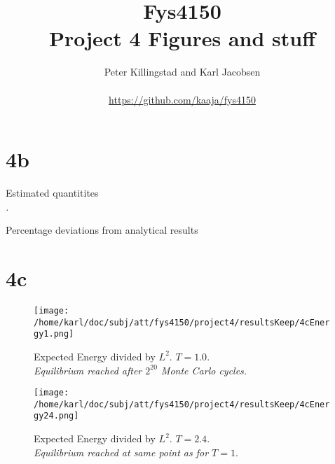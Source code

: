\documentclass{article}
\title{Fys4150\\Project 4 Figures and stuff\\ }
\author{Peter Killingstad and Karl Jacobsen\\
\\
\url{https://github.com/kaaja/fys4150}}
\begin{document}
	
\maketitle



\section*{4b}

\begin{table}[H]
	\centering
	\begin{adjustbox}{width=.5\textwidth}
	\end{adjustbox}
	\caption{Estimated quantitites \\ \textit{.}}
	\label{1}
\end{table}

\begin{table}[H]
	\centering
	\begin{adjustbox}{width=.5\textwidth}
	\end{adjustbox}
	\caption{Percentage deviations from analytical results}
	\label{1}
\end{table}


\section{4c}

\begin{minipage}{.45\textwidth} 
	\begin{figure}[H]
		\centering
		\texttt{[image: /home/karl/doc/subj/att/fys4150/project4/resultsKeep/4cEnergy1.png]}
		\caption{Expected Energy divided by $L^2$. $T=1.0$. \\ \textit{Equilibrium reached after $2^{20}$ Monte Carlo cycles.}}
		\label{1}
	\end{figure}
\end{minipage}\hfill
\begin{minipage}{.45\textwidth} 
	\begin{figure}[H]
		\centering
		\texttt{[image: /home/karl/doc/subj/att/fys4150/project4/resultsKeep/4cEnergy24.png]}
		\caption{Expected Energy divided by $L^2$. $T = 2.4$. \\ \textit{Equilibrium reached at same point as for $T=1$}.}
		\label{1}
	\end{figure}
\end{minipage}\hfill
\vspace{2ex}
\end{document}
